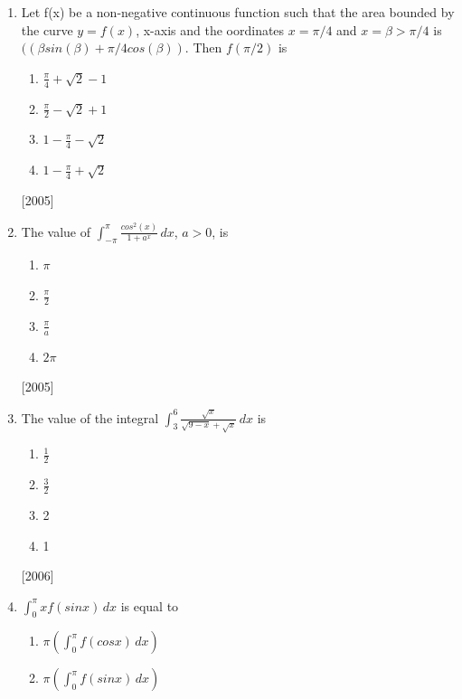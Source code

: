\documentclass[journal,12pt,twocolumn]{IEEEtran}
\theoremstyle{remark}
\begin{document}
\begin{enumerate}
		     \begin{enumerate}
		             \item 1:2:1
		             \item 1:2:3
		             \item 2:1:2
		             \item 1:1:1
		     \end{enumerate}
		     \hfill [2005] 
	     \item 
		      Let f(x) be a non-negative continuous function such that the area bounded by the curve $y=f(x)$, x-axis and the oordinates $x=\pi/4$ and $x=\beta>\pi/4$ is $((\beta sin(\beta)+\pi/4cos(\beta))$. Then $f(\pi/2)$ is
		     \begin{enumerate}
		            \item $\frac{\pi}{4}+\sqrt{2}-1$
		            \item $\frac{\pi}{2}-\sqrt{2}+1$
		            \item $1-\frac{\pi}{4}-\sqrt{2}$
		            \item $1-\frac{\pi}{4}+\sqrt{2}$
		     \end{enumerate}
		     \hfill [2005] 
	     \item 
		      The value of $\int_{-\pi}^{\pi} \frac{cos^{2}(x)}{1+a^{x}}\,dx$, $a>0$, is
		     \begin{enumerate}
		           \item $\pi$
		           \item $\frac{\pi}{2}$
		           \item $\frac{\pi}{a}$
		           \item $2\pi$
		     \end{enumerate}
		     \hfill [2005] 
	     \item 
		     The value of the integral $\int_{3}^{6} \frac{\sqrt{x}}{\sqrt{9-x}+\sqrt{x}} \,dx$ is
		    \begin{enumerate}
		          \item $\frac{1}{2}$
		          \item $\frac{3}{2}$
		          \item 2
		          \item 1
		    \end{enumerate}
		    \hfill [2006] 
	     \item 
		     $\int_{0}^{\pi} xf(sinx) \,dx$ is equal to
		    \begin{enumerate}
		         \item $\pi (\int_{0}^{\pi} f(cosx) \,dx)$
		         \item $\pi (\int_{0}^{\pi} f(sinx) \,dx)$

\end{enumerate}
\end{enumerate}
\end{document}
